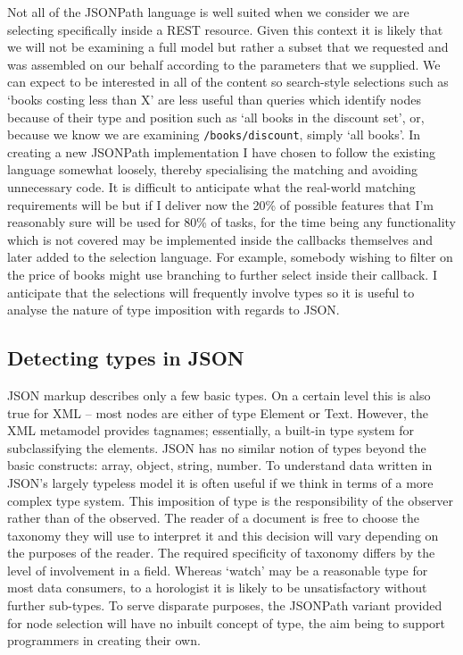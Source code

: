 \documentclass[]{article}
\begin{document}
Not all of the JSONPath language is well suited when we consider we are
selecting specifically inside a REST resource. Given this context it is
likely that we will not be examining a full model but rather a subset
that we requested and was assembled on our behalf according to the
parameters that we supplied. We can expect to be interested in all of
the content so search-style selections such as `books costing less than
X' are less useful than queries which identify nodes because of their
type and position such as `all books in the discount set', or, because
we know we are examining \texttt{/books/discount}, simply `all books'.
In creating a new JSONPath implementation I have chosen to follow the
existing language somewhat loosely, thereby specialising the matching
and avoiding unnecessary code. It is difficult to anticipate what the
real-world matching requirements will be but if I deliver now the 20\%
of possible features that I'm reasonably sure will be used for 80\% of
tasks, for the time being any functionality which is not covered may be
implemented inside the callbacks themselves and later added to the
selection language. For example, somebody wishing to filter on the price
of books might use branching to further select inside their callback. I
anticipate that the selections will frequently involve types so it is
useful to analyse the nature of type imposition with regards to JSON.

\subsection{Detecting types in JSON}

JSON markup describes only a few basic types. On a certain level this is
also true for XML -- most nodes are either of type Element or Text.
However, the XML metamodel provides tagnames; essentially, a built-in
type system for subclassifying the elements. JSON has no similar notion
of types beyond the basic constructs: array, object, string, number. To
understand data written in JSON's largely typeless model it is often
useful if we think in terms of a more complex type system. This
imposition of type is the responsibility of the observer rather than of
the observed. The reader of a document is free to choose the taxonomy
they will use to interpret it and this decision will vary depending on
the purposes of the reader. The required specificity of taxonomy differs
by the level of involvement in a field. Whereas `watch' may be a
reasonable type for most data consumers, to a horologist it is likely to
be unsatisfactory without further sub-types. To serve disparate
purposes, the JSONPath variant provided for node selection will have no
inbuilt concept of type, the aim being to support programmers in
creating their own.
\end{document}
